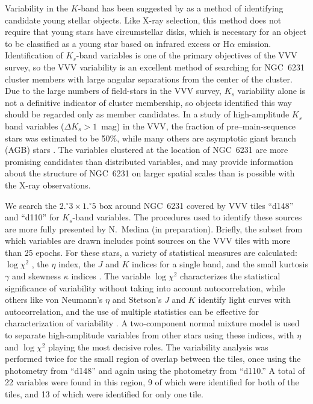 \documentclass[twocolumn,tighten]{aastex61}
\begin{document}
Variability in the $K$-band has been suggested by \citet{1999AJ....118..558K} as a method of identifying candidate young stellar objects. Like X-ray selection, this method does not require that young stars have circumstellar disks, which is necessary for an object to be classified as a young star based on infrared excess or H$\alpha$ emission. Identification of $K_s$-band variables is one of the primary objectives of the VVV survey, so the VVV variability is an excellent method of searching for NGC~6231 cluster members with large angular separations from the center of the cluster. Due to the large numbers of field-stars in the VVV survey, $K_s$ variability alone is not a definitive indicator of cluster membership, so objects identified this way should be regarded only as member candidates. In a study of high-amplitude $K_s$ band variables ($\Delta K_s>1$~mag) in the VVV, the fraction of pre--main-sequence stars was estimated to be 50\%, while many others are asymptotic giant branch (AGB) stars \citep{2016arXiv160206269C,2016arXiv160206267C}. The variables clustered at the location of NGC~6231 are more promising candidates than distributed variables, and may provide information about the structure of NGC~6231 on larger spatial scales than is possible with the X-ray observations. 

We search the $2.\!^\circ3\times1.\!^\circ5$ box around NGC~6231 covered by VVV tiles ``d148'' and ``d110'' for $K_s$-band variables. The procedures used to identify these sources are more fully presented by N.\ Medina (in preparation). Briefly, the subset from which variables are drawn includes point sources on the VVV tiles with more than 25 epochs.
For these stars, a variety of statistical measures are calculated: $\log \chi^2$ \citep[e.g.,][]{2014AJ....148...92R}, the \citet{von1941distribution} $\eta$ index, the \citet{1996PASP..108..851S} $J$ and $K$ indices for a single band, and the small kurtosis $\gamma$ and skewness $\kappa$ indices \citep{2011ApJ...733...10R}. The variable $\log \chi^2$ characterizes the statistical significance of variability without taking into account autocorrelation, while others like von Neumann's $\eta$ and Stetson's $J$ and $K$ identify light curves with autocorrelation, and the use of multiple statistics can be effective for characterization of variability \citep{2009MNRAS.400.1897S}.  A two-component normal mixture model is used to separate high-amplitude variables from other stars using these indices, with  $\eta$ and $\log \chi^2$ playing the most decisive roles. The variability analysis was performed twice for the small region of overlap between the tiles, once using the photometry from ``d148'' and again using the photometry from ``d110.'' A total of 22 variables were found in this region, 9 of which were identified for both of the tiles, and 13 of which were identified for only one tile.
\end{document}
